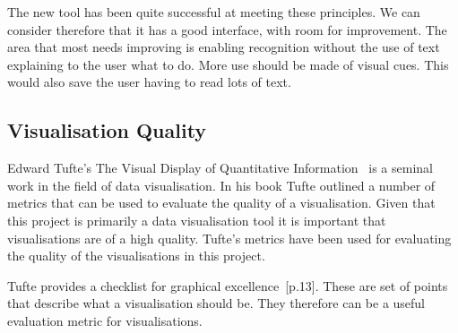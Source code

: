 The new tool has been quite successful at meeting these principles.  We can consider therefore that it has a good interface, with room for improvement.  The area that most needs improving is enabling recognition without the use of text explaining to the user what to do.  More use should be made of visual cues.  This would also save the user having to read lots of text.

\subsection{Visualisation Quality}

Edward Tufte's The Visual Display of Quantitative Information~\cite{tufte} is a seminal work in the field of data visualisation.  In his book Tufte outlined a number of metrics that can be used to evaluate the quality of a visualisation.  Given that this project is primarily a data visualisation tool it is important that visualisations are of a high quality.  Tufte's metrics have been used for evaluating the quality of the visualisations in this project.

Tufte provides a checklist for graphical excellence~\cite{tufte}[p.13].  These are set of points that describe what a visualisation should be.  They therefore can be a useful evaluation metric for visualisations.

